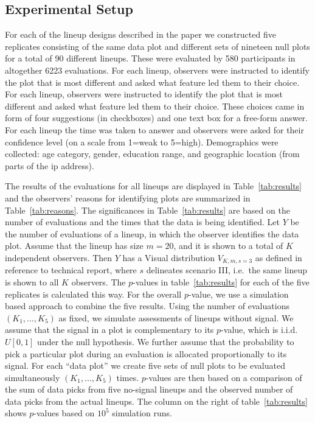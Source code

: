 \documentclass[12pt]{article} %
\newcommand{\hh}[1]{{\color{orange} #1}}
\begin{document}
\subsection{Experimental Setup}\label{sec:pvalues}
For each of the lineup designs described in the paper we constructed five replicates consisting of the same data plot and different sets of nineteen null plots for a total of 90 different lineups. These were evaluated by 580 participants in altogether 6223 evaluations. For each lineup, observers were instructed to identify the plot that is most different and asked what feature led them to their choice. 
For each lineup, observers were instructed to identify the plot that is most different and asked what feature led them to their choice. These choices came in form of four suggestions (in checkboxes) and one text box for a free-form answer. For each lineup the time was taken to answer and  observers were asked for their confidence level (on a scale from 1=weak to 5=high). Demographics were collected: age category, gender,  education range, and geographic location (from parts of the ip address). 

The results of the evaluations for all lineups  are displayed in Table~\ref{tab:results} and the observers' reasons for identifying plots are summarized in Table~\ref{tab:reasons}. 
The significances in Table~\ref{tab:results} are based on the number of evaluations and the times that the data is being identified. 
Let $Y$ be the number of evaluations of a lineup, in which the observer identifies the data plot. Assume that the lineup has size $m=20$, and it is shown to a total of $K$ independent observers.  Then $Y$ has a Visual distribution $V_{K, m, s=3}$ as defined in \hh{reference to technical report}, where $s$ delineates scenario III, i.e.~the same lineup is shown to all $K$ observers. The $p$-values in table~\ref{tab:results} for each of the five replicates is calculated this way.
For the overall $p$-value, we use a simulation based approach to combine the five results. Using the number of evaluations $(K_1, ..., K_5)$ as fixed, we simulate assessments of lineups without signal. We assume that the signal in a plot is complementary to its $p$-value, which is i.i.d. $U[0,1]$ under the null hypothesis. We further assume that the probability to pick a particular plot during an evaluation is allocated proportionally to its signal. For each ``data plot'' we create five sets of null plots to be evaluated simultaneously $(K_1, ..., K_5)$ times.  
$p$-values are then based on a comparison of the sum of data picks from  five no-signal lineups and  the observed number of data picks from the actual lineups. The column on the right of table~\ref{tab:results} shows $p$-values based on $10^5$ simulation runs.
\end{document}
